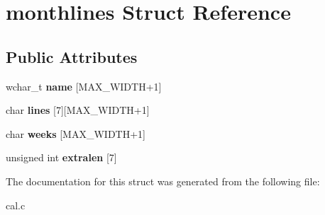 \hypertarget{structmonthlines}{
\section{monthlines Struct Reference}
\label{structmonthlines}
}
\subsection*{Public Attributes}
\begin{DoxyCompactItemize}
\item 
\hypertarget{structmonthlines_af3e8d7e2a00147ccda27a331292e4ebb}{
wchar\_\-t {\bfseries name} \mbox{[}MAX\_\-WIDTH+1\mbox{]}}
\label{structmonthlines_af3e8d7e2a00147ccda27a331292e4ebb}

\item 
\hypertarget{structmonthlines_a83672410f05fbaa7f7d3fafb5e559de0}{
char {\bfseries lines} \mbox{[}7\mbox{]}\mbox{[}MAX\_\-WIDTH+1\mbox{]}}
\label{structmonthlines_a83672410f05fbaa7f7d3fafb5e559de0}

\item 
\hypertarget{structmonthlines_af58118b218630528d627453d5102d726}{
char {\bfseries weeks} \mbox{[}MAX\_\-WIDTH+1\mbox{]}}
\label{structmonthlines_af58118b218630528d627453d5102d726}

\item 
\hypertarget{structmonthlines_ae3589f9c309d54dcb9404dbdd5bde899}{
unsigned int {\bfseries extralen} \mbox{[}7\mbox{]}}
\label{structmonthlines_ae3589f9c309d54dcb9404dbdd5bde899}

\end{DoxyCompactItemize}


The documentation for this struct was generated from the following file:\begin{DoxyCompactItemize}
\item 
cal.c\end{DoxyCompactItemize}
